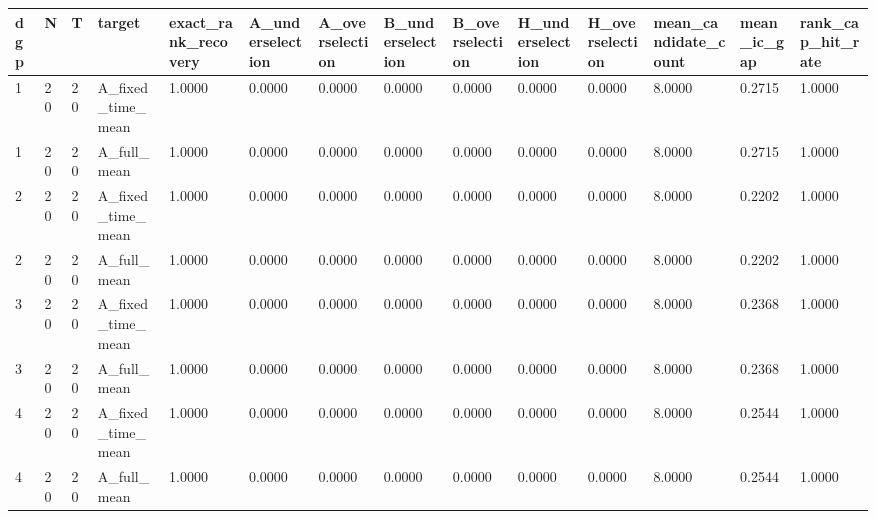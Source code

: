 \begin{tabular}{llllllllllllll}
\toprule
dgp & N & T & target & exact\_rank\_recovery & A\_underselection & A\_overselection & B\_underselection & B\_overselection & H\_underselection & H\_overselection & mean\_candidate\_count & mean\_ic\_gap & rank\_cap\_hit\_rate \\
\midrule
1 & 20 & 20 & A\_fixed\_time\_mean & 1.0000 & 0.0000 & 0.0000 & 0.0000 & 0.0000 & 0.0000 & 0.0000 & 8.0000 & 0.2715 & 1.0000 \\
1 & 20 & 20 & A\_full\_mean & 1.0000 & 0.0000 & 0.0000 & 0.0000 & 0.0000 & 0.0000 & 0.0000 & 8.0000 & 0.2715 & 1.0000 \\
2 & 20 & 20 & A\_fixed\_time\_mean & 1.0000 & 0.0000 & 0.0000 & 0.0000 & 0.0000 & 0.0000 & 0.0000 & 8.0000 & 0.2202 & 1.0000 \\
2 & 20 & 20 & A\_full\_mean & 1.0000 & 0.0000 & 0.0000 & 0.0000 & 0.0000 & 0.0000 & 0.0000 & 8.0000 & 0.2202 & 1.0000 \\
3 & 20 & 20 & A\_fixed\_time\_mean & 1.0000 & 0.0000 & 0.0000 & 0.0000 & 0.0000 & 0.0000 & 0.0000 & 8.0000 & 0.2368 & 1.0000 \\
3 & 20 & 20 & A\_full\_mean & 1.0000 & 0.0000 & 0.0000 & 0.0000 & 0.0000 & 0.0000 & 0.0000 & 8.0000 & 0.2368 & 1.0000 \\
4 & 20 & 20 & A\_fixed\_time\_mean & 1.0000 & 0.0000 & 0.0000 & 0.0000 & 0.0000 & 0.0000 & 0.0000 & 8.0000 & 0.2544 & 1.0000 \\
4 & 20 & 20 & A\_full\_mean & 1.0000 & 0.0000 & 0.0000 & 0.0000 & 0.0000 & 0.0000 & 0.0000 & 8.0000 & 0.2544 & 1.0000 \\
\bottomrule
\end{tabular}

